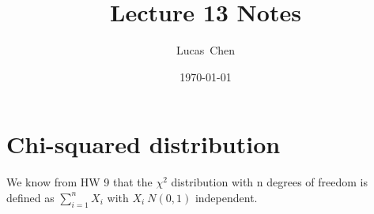 \documentclass{amsart}
\title{Lecture 13 Notes}
\author{Lucas\ Chen}
\date{\today}
\begin{document}
\maketitle

\section{Chi-squared distribution}

We know from HW 9 that the $\chi^2$ distribution with n degrees of freedom is defined as $\sum_{i=1}^n X_i$ with $X_i ~ N(0,1)$ independent.
\end{document}
